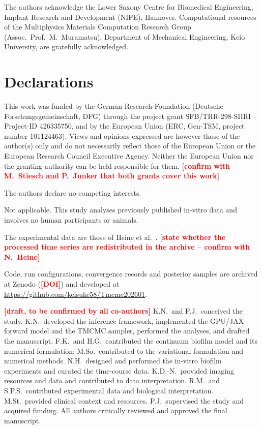 \documentclass[pdflatex,sn-mathphys-num,lineno]{sn-jnl}
\newcommand{\TBD}[1]{\textcolor{red}{\textbf{[#1]}}}
\begin{document}
\backmatter

The authors acknowledge the Lower Saxony Centre for Biomedical Engineering, Implant Research and Development (NIFE), Hannover.
Computational resources of the Multiphysics Materials Computation Research Group (Assoc.\ Prof.\ M.~Muramatsu), Department of Mechanical Engineering, Keio University, are gratefully acknowledged.

\section*{Declarations}

This work was funded by the German Research Foundation (Deutsche Forschungsgemeinschaft, DFG) through the project grant SFB/TRR-298-SIIRI -- Project-ID 426335750, and by the European Union (ERC, Gen-TSM, project number 101124463).
Views and opinions expressed are however those of the author(s) only and do not necessarily reflect those of the European Union or the European Research Council Executive Agency. Neither the European Union nor the granting authority can be held responsible for them.
\TBD{confirm with M.~Stiesch and P.~Junker that both grants cover this work}

The authors declare no competing interests.

Not applicable. This study analyses previously published in-vitro data and involves no human participants or animals.

The experimental data are those of Heine et al.~\cite{heine2025influence}.
\TBD{state whether the processed time series are redistributed in the archive -- confirm with N.~Heine}

Code, run configurations, convergence records and posterior samples are archived at Zenodo (\TBD{DOI}) and developed at \url{https://github.com/keisuke58/Tmcmc202601}.

\TBD{draft, to be confirmed by all co-authors}
K.N.\ and P.J.\ conceived the study.
K.N.\ developed the inference framework, implemented the GPU/JAX forward model and the TMCMC sampler, performed the analyses, and drafted the manuscript.
F.K.\ and H.G.\ contributed the continuum biofilm model and its numerical formulation; M.So.\ contributed to the variational formulation and numerical methods.
N.H.\ designed and performed the in-vitro biofilm experiments and curated the time-course data.
K.D.-N.\ provided imaging resources and data and contributed to data interpretation.
R.M.\ and S.P.S.\ contributed experimental data and biological interpretation.
M.St.\ provided clinical context and resources.
P.J.\ supervised the study and acquired funding.
All authors critically reviewed and approved the final manuscript.
\end{document}
